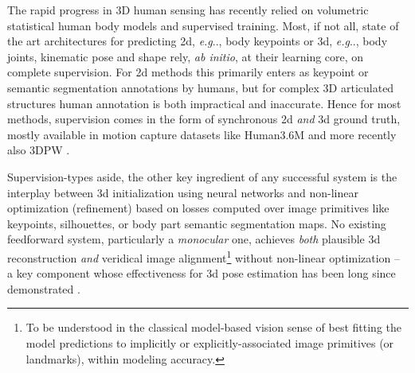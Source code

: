\documentclass[final]{cvpr}
\makeatletter
\DeclareRobustCommand\onedot{\futurelet\@let@token\@onedot}
\def\@onedot{\ifx\@let@token.\else.\null\fi\xspace}
\def\eg{\emph{e.g}\onedot} \def\Eg{\emph{E.g}\onedot}
\makeatother
\begin{document}
The rapid progress in 3D human sensing has recently relied on volumetric statistical human body models \cite{SMPL2015,ghum2020} and supervised training. Most, if not all, state of the art architectures for predicting 2d, \eg, body keypoints \cite{cao2017realtime} or 3d, \eg, body joints, kinematic pose and shape \cite{dmhs_cvpr17,zanfir2018monocular,Kanazawa2018,kolotouros2019learning, sun2019human, doersch2019sim2real, humanMotionKanazawa19, kolotouros2019convolutional, arnab2019exploiting, xu2019denserac, kocabas2019vibe, varol18_bodynet, jackson20183d, pavlakos2017cvpr, yang20183d, zhou2017towards, rogez2016mocap, Fua17, mehta2017vnect,martinez17iccv, iskakov2019learnable} rely, \emph{ab initio}, at their learning core, on complete supervision. For 2d methods this primarily enters as keypoint or semantic segmentation annotations by humans, but for complex 3D articulated structures human annotation is both impractical and inaccurate. Hence for most methods, supervision comes in the form of synchronous 2d \emph{and} 3d ground truth, mostly available in motion capture datasets like Human3.6M \cite{Ionescu14pami} and more recently also 3DPW \cite{vonMarcard2018}. 

Supervision-types aside, the other key ingredient of any successful system is the interplay between 3d initialization using neural networks and non-linear optimization (refinement) based on losses computed over image primitives like keypoints, silhouettes, or body part semantic segmentation maps. No existing feedforward system, particularly a \emph{monocular} one, achieves \emph{both} plausible 3d reconstruction \emph{and} veridical image alignment\footnote{To be understood in the classical model-based vision sense of best fitting the model predictions to implicitly or explicitly-associated image primitives (or landmarks), within modeling accuracy.} without non-linear optimization -- a key component whose effectiveness for 3d pose estimation has been long since demonstrated \cite{sminchisescu_ijrr03,sminchisescu_cvpr03}.
\end{document}
